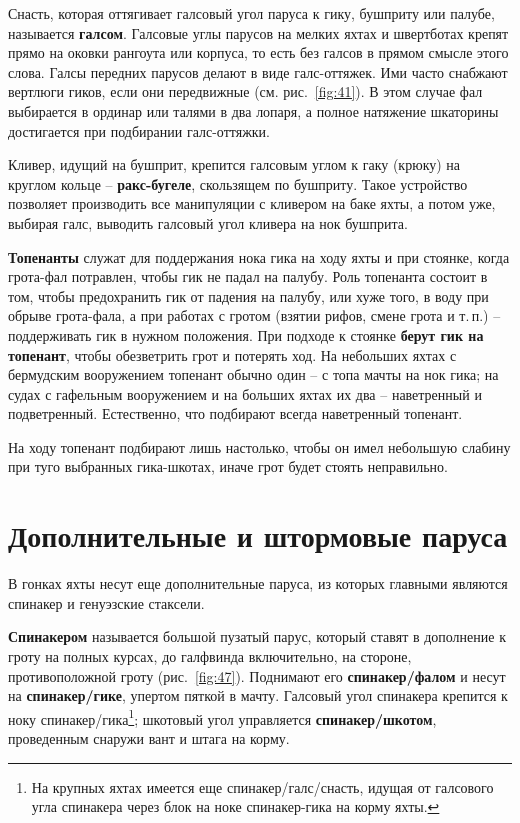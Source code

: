 \documentclass[a4paper, 12pt, twoside, final]{scrbook}
\begin{document}
Снасть, которая оттягивает галсовый угол паруса к гику, бушприту или
палубе, называется \textbf{галсом}. Галсовые углы парусов на мелких
яхтах и швертботах крепят прямо на оковки рангоута или корпуса, то
есть без галсов в прямом смысле этого слова. Галсы передних парусов
делают в виде галс-оттяжек. Ими часто снабжают вертлюги гиков, если
они передвижные (см. рис.~\ref{fig:41}).
В этом случае фал выбирается в ординар или талями в два лопаря, а
полное натяжение шкаторины достигается при подбирании галс-оттяжки.

Кливер, идущий на бушприт, крепится галсовым углом к гаку (крюку)
на круглом кольце \--- \textbf{ракс-бугеле}, скользящем по бушприту.
Такое устройство позволяет производить все манипуляции с кливером
на баке яхты, а потом уже, выбирая галс, выводить галсовый угол кливера
на нок бушприта.

\textbf{Топенанты} служат для поддержания нока гика на ходу яхты и
при стоянке, когда грота-фал потравлен, чтобы гик не падал на палубу.
Роль топенанта состоит в том, чтобы предохранить гик от падения на
палубу, или хуже того, в воду при обрыве грота-фала, а при работах
с гротом (взятии рифов, смене грота и т.\,п.) \--- поддерживать гик в нужном
положения. При подходе к стоянке \textbf{берут гик на топенант}, чтобы
обезветрить грот и потерять ход. На небольших яхтах с бермудским вооружением
топенант обычно один \--- с топа мачты на нок гика; на судах с гафельным
вооружением и на больших яхтах их два \--- наветренный и подветренный.
Естественно, что подбирают всегда наветренный топенант.

На ходу топенант подбирают лишь настолько, чтобы он имел небольшую
слабину при туго выбранных гика-шкотах, иначе грот будет стоять неправильно.

%
%

\section{Дополнительные и штормовые паруса}

В гонках яхты несут еще дополнительные паруса, из которых главными являются спинакер и генуэзские стаксели.

\textbf{Спинакером} называется большой пузатый парус, который ставят в дополнение к гроту на полных курсах, до галфвинда включительно, на стороне, противоположной гроту (рис.~\ref{fig:47}). Поднимают его \textbf{спинакер\-/фалом} и несут на \textbf{спинакер\-/гике}, упертом пяткой в мачту. Галсовый угол спинакера крепится к ноку спинакер\-/гика\footnote{На крупных яхтах имеется еще спинакер\-/галс\-/снасть, идущая от галсового угла спинакера через блок на ноке спинакер-гика на корму яхты.}; шкотовый угол управляется \textbf{спинакер\-/шкотом}, проведенным снаружи вант и штага на корму.
\end{document}

